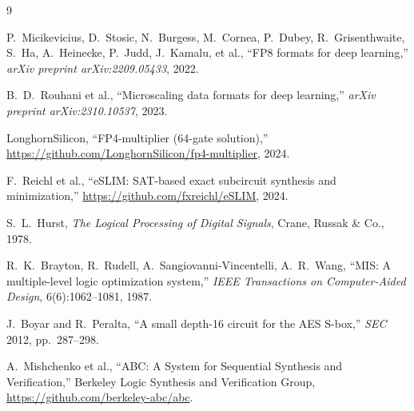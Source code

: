 \documentclass[11pt]{article}
\begin{document}
\begin{thebibliography}{9}

P.~Micikevicius, D.~Stosic, N.~Burgess, M.~Cornea, P.~Dubey,
R.~Grisenthwaite, S.~Ha, A.~Heinecke, P.~Judd, J.~Kamalu, et al.,
``FP8 formats for deep learning,''
\textit{arXiv preprint arXiv:2209.05433}, 2022.

B.~D.~Rouhani et al.,
``Microscaling data formats for deep learning,''
\textit{arXiv preprint arXiv:2310.10537}, 2023.

LonghornSilicon, ``FP4-multiplier (64-gate solution),''
\url{https://github.com/LonghornSilicon/fp4-multiplier}, 2024.

F.~Reichl et al., ``eSLIM: SAT-based exact subcircuit synthesis
and minimization,''
\url{https://github.com/fxreichl/eSLIM}, 2024.

S.~L.~Hurst,
\textit{The Logical Processing of Digital Signals},
Crane, Russak \& Co., 1978.

R.~K.~Brayton, R.~Rudell, A.~Sangiovanni-Vincentelli, A.~R.~Wang,
``MIS: A multiple-level logic optimization system,''
\textit{IEEE Transactions on Computer-Aided Design},
6(6):1062--1081, 1987.

J.~Boyar and R.~Peralta,
``A small depth-16 circuit for the AES S-box,''
\textit{SEC} 2012, pp.~287--298.

A.~Mishchenko et al.,
``ABC: A System for Sequential Synthesis and Verification,''
Berkeley Logic Synthesis and Verification Group,
\url{https://github.com/berkeley-abc/abc}.

\end{thebibliography}
\end{document}
